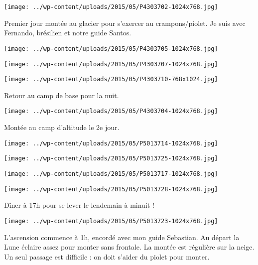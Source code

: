  \newline
\centerline{\texttt{[image: ../wp-content/uploads/2015/05/P4303702-1024x768.jpg]} } 
 \newline
 Premier jour montée au glacier pour s'exercer au crampons/piolet. Je suis avec Fernando, brésilien et notre guide Santos. \newline
 \newline
\centerline{\texttt{[image: ../wp-content/uploads/2015/05/P4303705-1024x768.jpg]} } 
 \newline
 \newline
\centerline{\texttt{[image: ../wp-content/uploads/2015/05/P4303707-1024x768.jpg]} } 
 \newline
 \newline
\centerline{\texttt{[image: ../wp-content/uploads/2015/05/P4303710-768x1024.jpg]} } 
 \newline
 Retour au camp de base pour la nuit. \newline
 \newline
\centerline{\texttt{[image: ../wp-content/uploads/2015/05/P4303704-1024x768.jpg]} } 
 \newline
 Montée au camp d'altitude le 2e jour. \newline
 \newline
\centerline{\texttt{[image: ../wp-content/uploads/2015/05/P5013714-1024x768.jpg]} } 
 \newline
 \newline
\centerline{\texttt{[image: ../wp-content/uploads/2015/05/P5013725-1024x768.jpg]} } 
 \newline
 \newline
\centerline{\texttt{[image: ../wp-content/uploads/2015/05/P5013717-1024x768.jpg]} } 
 \newline
 \newline
\centerline{\texttt{[image: ../wp-content/uploads/2015/05/P5013728-1024x768.jpg]} } 
 \newline
 Dîner à 17h pour se lever le lendemain à minuit ! \newline
 \newline
\centerline{\texttt{[image: ../wp-content/uploads/2015/05/P5013723-1024x768.jpg]} } 
 \newline
 L'ascension commence à 1h, encordé avec mon guide Sebastian. \newline
 Au départ la Lune éclaire assez pour monter sans frontale. La montée est régulière sur la neige. Un seul passage est difficile : on doit s'aider du piolet pour monter. \newline
